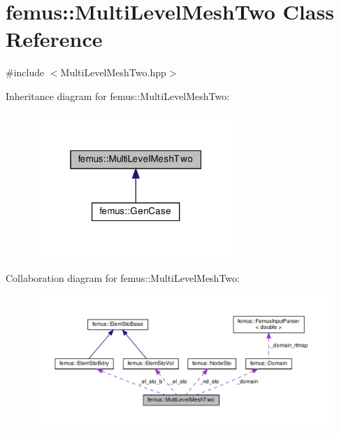\hypertarget{classfemus_1_1_multi_level_mesh_two}{}\section{femus\+:\+:Multi\+Level\+Mesh\+Two Class Reference}
\label{classfemus_1_1_multi_level_mesh_two}


{\ttfamily \#include $<$Multi\+Level\+Mesh\+Two.\+hpp$>$}



Inheritance diagram for femus\+:\+:Multi\+Level\+Mesh\+Two\+:
\nopagebreak
\begin{figure}[H]
\begin{center}
\leavevmode
\includegraphics[width=220pt]{classfemus_1_1_multi_level_mesh_two__inherit__graph}
\end{center}
\end{figure}


Collaboration diagram for femus\+:\+:Multi\+Level\+Mesh\+Two\+:
\nopagebreak
\begin{figure}[H]
\begin{center}
\leavevmode
\includegraphics[width=350pt]{classfemus_1_1_multi_level_mesh_two__coll__graph}
\end{center}
\end{figure}
